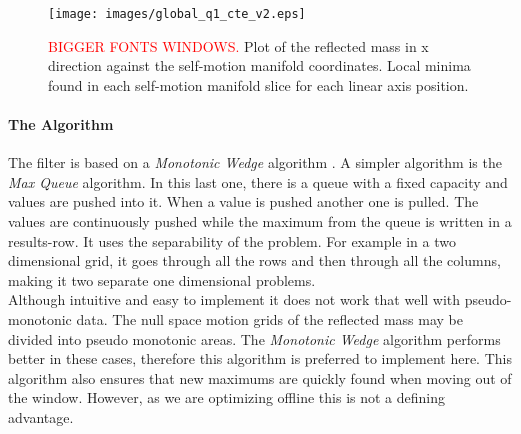\begin{figure}[htb]
	\centerline{
		\texttt{[image: images/global\_q1\_cte\_v2.eps]}}
	\caption{\textcolor{red}{BIGGER FONTS WINDOWS.} Plot of the reflected mass in x direction against the self-motion
		manifold coordinates. Local minima found in each self-motion manifold slice for each linear axis position. }
	\label{fig:maxminfilter2}
\end{figure}





\paragraph{The Algorithm}
\label{subsec:global_alg}

The filter is based on a \textit{Monotonic Wedge} algorithm \cite{Lemire}.
A simpler algorithm is the \textit{Max Queue} algorithm. In this last one, there is a queue with a fixed capacity and values are pushed into it. When a value is pushed another one is pulled. The values are continuously pushed while the maximum from the queue is written in a results-row.
It uses the separability of the problem.  For example in a two dimensional grid, it goes through all the rows and then through all the columns, making it two separate one dimensional problems.\\
%
Although intuitive and easy to implement it does not work that well with pseudo-monotonic data. The null space motion grids of the reflected mass may be divided into pseudo monotonic areas. The \textit{Monotonic Wedge} algorithm performs better in these cases, therefore this algorithm is preferred to implement here. This algorithm also ensures that new maximums are quickly found when moving out of the window. However, as we are optimizing offline this is not a defining advantage.





